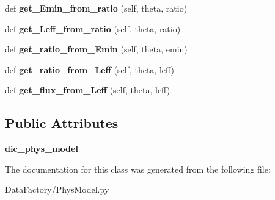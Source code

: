 \begin{DoxyCompactItemize}
def {\bfseries get\+\_\+\+Emin\+\_\+from\+\_\+ratio} (self, theta, ratio)
\item 
\mbox{\label{classMIS_1_1DataFactory_1_1PhysModel_1_1PhysModelFromHist_aba920be25925cd621bb6066311ab3079}} 
def {\bfseries get\+\_\+\+Leff\+\_\+from\+\_\+ratio} (self, theta, ratio)
\item 
\mbox{\label{classMIS_1_1DataFactory_1_1PhysModel_1_1PhysModelFromHist_a7aafe625c54b6ade55b06ee43ac9fd5b}} 
def {\bfseries get\+\_\+ratio\+\_\+from\+\_\+\+Emin} (self, theta, emin)
\item 
\mbox{\label{classMIS_1_1DataFactory_1_1PhysModel_1_1PhysModelFromHist_ac6febe85bd12603381268081bdba279d}} 
def {\bfseries get\+\_\+ratio\+\_\+from\+\_\+\+Leff} (self, theta, leff)
\item 
\mbox{\label{classMIS_1_1DataFactory_1_1PhysModel_1_1PhysModelFromHist_ae95445d741df1c56c9c2709efc005b92}} 
def {\bfseries get\+\_\+flux\+\_\+from\+\_\+\+Leff} (self, theta, leff)
\end{DoxyCompactItemize}
\subsection*{Public Attributes}
\begin{DoxyCompactItemize}
\item 
\mbox{\label{classMIS_1_1DataFactory_1_1PhysModel_1_1PhysModelFromHist_a6da1082f34ec58ee355f93bcbd63f468}} 
{\bfseries dic\+\_\+phys\+\_\+model}
\end{DoxyCompactItemize}


The documentation for this class was generated from the following file\+:\begin{DoxyCompactItemize}
\item 
Data\+Factory/Phys\+Model.\+py\end{DoxyCompactItemize}
